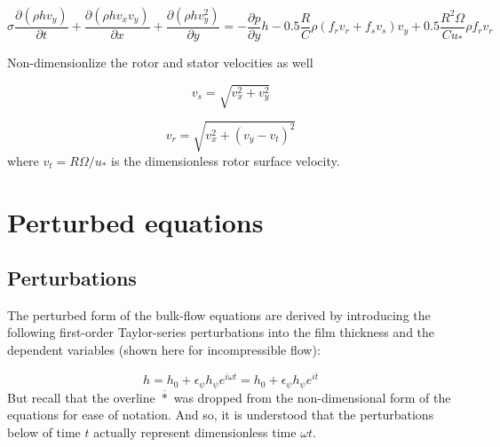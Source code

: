 \documentclass[12pt,letterpaper]{article}
\begin{document}
\begin{dmath}
\sigma \frac{\partial \left( \rho h v_y \right)}{\partial t} +
\frac{\partial \left( \rho h v_x v_y \right)}{\partial x} +
\frac{\partial \left( \rho h v_y^2 \right)}{\partial y} =
- \frac{\partial p }{\partial y } h - 
0.5 \frac{R}{C} \rho \left( f_r v_r + f_s v_s \right) v_y +
0.5 \frac{R^2 \Omega}{C u_*} \rho f_r v_r
\end{dmath}

Non-dimensionlize the rotor and stator velocities as well

\begin{equation} \label{eq:vel:stator}
v_s = \sqrt{v_x ^2 + v_y^2}
\end{equation}

\begin{equation} \label{eq:vel:rotor}
v_r =  \sqrt{v_x^2 + \left( v_y - v_t \right)^2 }
\end{equation}
%
where $v_t= R \Omega / u_*$ is the 
dimensionless rotor surface velocity.


\section{Perturbed equations}


\subsection{Perturbations}

The perturbed form of the bulk-flow equations are derived by
introducing the following first-order Taylor-series perturbations
into the film thickness and the dependent variables (shown
here for incompressible flow):

\begin{equation*}
h =   h_0 +    \epsilon_{\psi} h_{\psi}    e^{i \omega t} = 
h_0 + \epsilon_{\psi} h_{\psi}    e^{i \overline{t}}
\end{equation*}
%
But recall that the overline $\overline{*}$ was dropped from the
non-dimensional form of the equations for ease of notation.
And so, it is understood that the perturbations below of time
$t$ actually represent dimensionless time $\omega t$.
\end{document}
